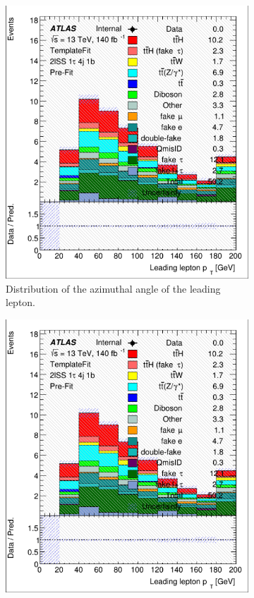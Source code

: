 \begin{figure}[htb!]
    \centering
    \begin{subfigure}{0.45\textwidth}
        \includegraphics[width=\linewidth]{figures/plots/histograms/lep_Phi_0.png}
        \caption{Distribution of the azimuthal angle of the leading lepton.}
        \label{fig:lep_Phi_0}
    \end{subfigure}\hfill%
    \begin{subfigure}{0.45\textwidth}
        \includegraphics[width=\linewidth]{figures/plots/histograms/lep_Phi_1.png}

\end{subfigure}
\end{figure}
